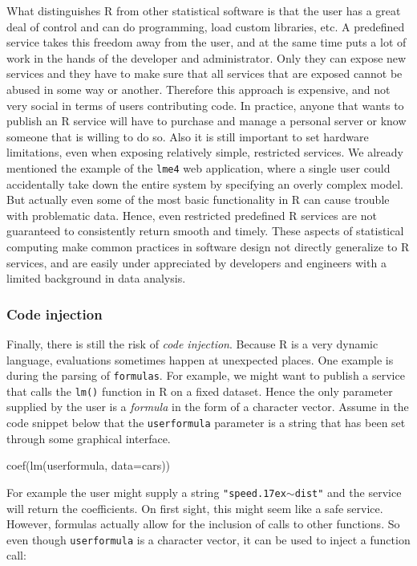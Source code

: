 \documentclass{jss}
\newcommand{\R}{\textsf{R}\xspace}
\begin{document}
What distinguishes \R from other statistical software is that the user has a
great deal of control and can do programming, load custom libraries, etc. A
predefined service takes this freedom away from the user, and at the same time
puts a lot of work in the hands of the developer and administrator. Only they
can expose new services and they have to make sure that all services that are
exposed cannot be abused in some way or another. Therefore this approach is
expensive, and not very social in terms of users contributing code. In
practice, anyone that wants to publish an \R service will have to purchase and
manage a personal server or know someone that is willing to do so. Also it is
still important to set hardware limitations, even when exposing relatively
simple, restricted services. We already mentioned the example of the
\texttt{lme4} web application, where a single user could accidentally take down
the entire system by specifying an overly complex model. But actually even some
of the most basic functionality in \R can cause trouble with problematic data.
Hence, even restricted predefined \R services are not guaranteed to
consistently return smooth and timely. These aspects of statistical computing
make common practices in software design not directly generalize to \R
services, and are easily under appreciated by developers and engineers with a
limited background in data analysis.

\subsubsection{Code injection}

Finally, there is still the risk of \emph{code injection}. Because \R is a very
dynamic language, evaluations sometimes happen at unexpected places. One example
is during the parsing of \texttt{formulas}. For example, we might want to
publish a service that calls the \texttt{lm()} function in \R on a fixed
dataset. Hence the only parameter supplied by the user is a \emph{formula} in
the form of a character vector. Assume in the code snippet below that the
 \texttt{userformula} parameter is a string that has been set through some
graphical interface.

\begin{CodeChunk}
\begin{CodeInput}
coef(lm(userformula, data=cars))
\end{CodeInput}
\end{CodeChunk}

For example the user might supply a string
\texttt{"speed{\raise.17ex\hbox{$\scriptstyle\sim$}}dist"} and the service
will return the coefficients. On first sight, this might seem like a safe
service. However, formulas actually allow for the inclusion of calls to other
functions. So even though \texttt{userformula} is a character vector, it can be
used to inject a function call:
\end{document}
